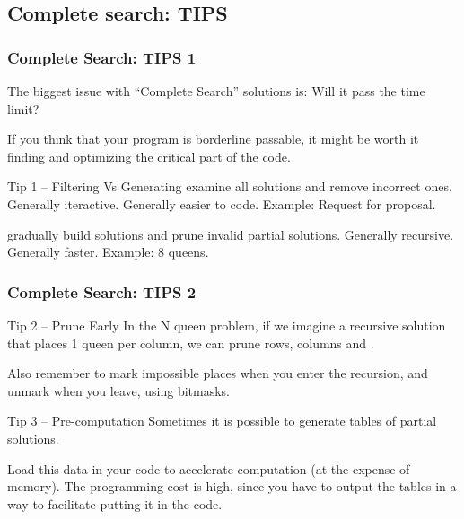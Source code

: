 \documentclass{beamer}
\begin{document}
\subsection{Complete search: TIPS}

\begin{frame}
  \frametitle{Complete Search: TIPS 1}
  The biggest issue with ``Complete Search'' solutions is: Will it
  pass the time limit?

  \medskip

  If you think that your program is borderline passable, it might be
  worth it finding and optimizing the critical part of the code.

  \vfill

  {\smaller
  \begin{block}{Tip 1 -- Filtering Vs Generating}
     examine all solutions and remove
    incorrect ones. Generally iteractive. Generally easier to
    code. Example: Request for proposal.

    \bigskip

     gradually build solutions and
    prune invalid partial solutions. Generally recursive. Generally
    faster. Example: 8 queens.
  \end{block}}
\end{frame}

\begin{frame}
  \frametitle{Complete Search: TIPS 2}
  {\smaller
    \begin{block}{Tip 2 -- Prune Early}
      In the N queen problem, if we imagine a recursive solution that
      places 1 queen per column, we can prune rows, columns and
      .

      \smallskip

      Also remember to mark impossible places when you enter the
      recursion, and unmark when you leave, using bitmasks.
    \end{block}

    \vfill

    \begin{block}{Tip 3 -- Pre-computation}
      Sometimes it is possible to generate tables of partial solutions.

      \medskip

      Load this data in your code to accelerate computation (at the
      expense of memory). The programming cost is high, since you have
      to output the tables in a way to facilitate putting it in the
      code.
    \end{block}

    }
\end{frame}
\end{document}
